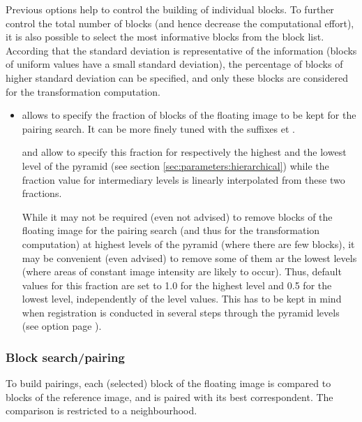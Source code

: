 Previous options help to control the building of individual blocks. To further control the total number of blocks (and hence decrease the computational effort), it is also possible to select the most informative blocks from the block list. According that the standard deviation is representative of the information (blocks of uniform values have a small standard deviation), the percentage of blocks of higher standard deviation can be specified, and only these blocks are considered for the transformation computation.

\begin{itemize}
\item[] \label{opt:floating:selection:fraction}  allows to specify the fraction of blocks of the floating image to be kept for the pairing search. It can be more finely tuned with the suffixes  et . 

 and
  allow to specify this
fraction for respectively the highest and the lowest level of the
pyramid (see section \ref{sec:parameters:hierarchical}) while the
fraction value for intermediary levels is linearly interpolated from
these two fractions.

While it may not be required (even not advised) to remove blocks of
the floating image for the pairing search (and thus for the
transformation computation) at highest levels of the pyramid (where
there are few blocks), it may be convenient (even advised) to remove
some of them ar the lowest levels (where areas of constant image
intensity are likely to occur). Thus, default values for this fraction
are set to 1.0 for the highest level and 0.5 for the lowest level,
independently of the level values. This has to be kept in mind when
registration is conducted in several steps through the pyramid levels
(see option  page \pageref{opt:initial:result:transformation}).
\end{itemize}


\subsubsection{Block search/pairing}
\label{sec:parameters:block:pairing}

To build pairings, each (selected) block of the floating image is compared to blocks of the reference image, and is paired with its best correspondent. The comparison is restricted to a neighbourhood.
 
